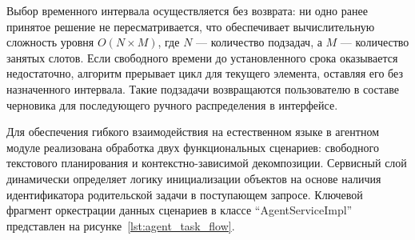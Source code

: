Выбор временного интервала осуществляется без возврата: ни одно ранее принятое решение не пересматривается, что обеспечивает вычислительную сложность уровня $O(N \times M)$, где $N$ --- количество подзадач, а $M$ --- количество занятых слотов. Если свободного времени до установленного срока оказывается недостаточно, алгоритм прерывает цикл для текущего элемента, оставляя его без назначенного интервала. Такие подзадачи возвращаются пользователю в составе черновика для последующего ручного распределения в интерфейсе.

\numberedparagraph
Для обеспечения гибкого взаимодействия на естественном языке в агентном модуле реализована обработка двух функциональных сценариев: свободного текстового планирования и контекстно-зависимой декомпозиции. Сервисный слой динамически определяет логику инициализации объектов на основе наличия идентификатора родительской задачи в поступающем запросе. Ключевой фрагмент оркестрации данных сценариев в классе ``AgentServiceImpl'' представлен на рисунке~\ref{lst:agent_task_flow}.

